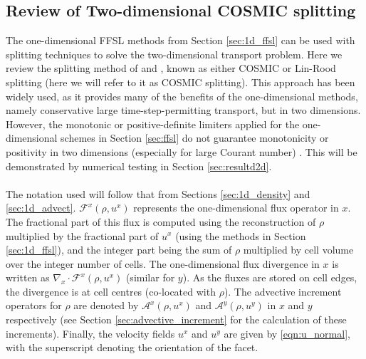 \documentclass[11pt,a4paper]{article}
\begin{document}
\subsection{Review of Two-dimensional COSMIC splitting} \label{sec:cosmic}

The one-dimensional FFSL methods from Section \ref{sec:1d_ffsl} can be used with splitting techniques to solve the two-dimensional transport problem. Here we review the splitting method of \citet{leonard1996cosmic} and \citet{lin1996ffsl}, known as either COSMIC or Lin-Rood splitting (here we will refer to it as COSMIC splitting). This approach has been widely used, as it provides many of the benefits of the one-dimensional methods, namely conservative large time-step-permitting transport, but in two dimensions. However, the monotonic or positive-definite limiters applied for the one-dimensional schemes in Section \ref{sec:ffsl} do not guarantee monotonicity or positivity in two dimensions (especially for large Courant number) \citep{lin1996ffsl,leonard1996cosmic}.
This will be demonstrated by numerical testing in Section \ref{sec:resultd2d}. \\ 
\\
The notation used will follow that from Sections \ref{sec:1d_density} and \ref{sec:1d_advect}. $\mathcal{F}^x(\rho,u^x)$ represents the one-dimensional flux operator in $x$. 
The fractional part of this flux is computed using the reconstruction of $\rho$ multiplied by the fractional part of $u^x$ (using the methods in Section \ref{sec:1d_ffsl}), and the integer part being the sum of $\rho$ multiplied by cell volume over the integer number of cells. The one-dimensional flux divergence in $x$ is written as $\nabla_x\cdot \mathcal{F}^x(\rho,u^x)$ (similar for $y$).
As the fluxes are stored on cell edges, the divergence is at cell centres (co-located with $\rho$).
The advective increment operators for $\rho$ are denoted by $\mathcal{A}^x(\rho,u^x)$ and $\mathcal{A}^y(\rho,u^y)$ in $x$ and $y$ respectively  (see Section \ref{sec:advective_increment} for the calculation of these increments).
Finally, the velocity fields $u^x$ and $u^y$ are given by \eqref{eqn:u_normal}, with the superscript denoting the orientation of the facet.
\end{document}

